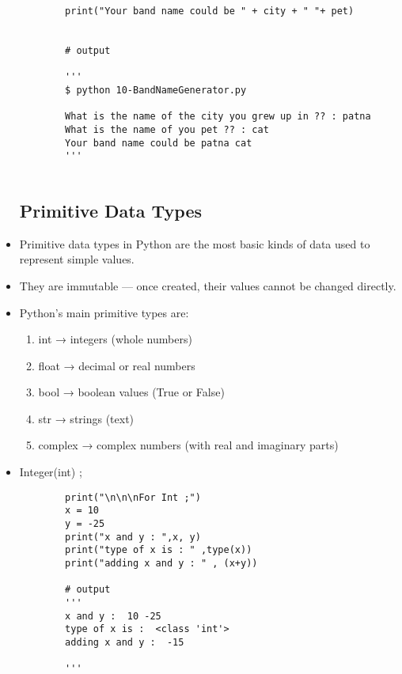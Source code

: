 \documentclass[a4paper,11pt]{article}
\theoremstyle{mytheor}
\begin{document}
\begin{itemize}
\begin{lstlisting}
		print("Your band name could be " + city + " "+ pet)
		
		
		# output
		
		'''
		$ python 10-BandNameGenerator.py

		What is the name of the city you grew up in ?? : patna
		What is the name of you pet ?? : cat
		Your band name could be patna cat
		'''
		
	\end{lstlisting}
	
	\subsection{Primitive Data Types}
	\item Primitive data types in Python are the most basic kinds of data used to represent simple values.
	
	\item They are immutable — once created, their values cannot be changed directly.
	
	\item Python’s main primitive types are:
	\begin{enumerate}
		\item int → integers (whole numbers)
		
		\item float → decimal or real numbers
		
		\item bool → boolean values (True or False)
		
		\item str → strings (text)
		
		\item complex → complex numbers (with real and imaginary parts)
	\end{enumerate}
	
	\item Integer(int) ;
	
	\begin{lstlisting}
		print("\n\n\nFor Int ;")
		x = 10
		y = -25
		print("x and y : ",x, y)
		print("type of x is : " ,type(x))
		print("adding x and y : " , (x+y))
		
		# output
		'''
		x and y :  10 -25
		type of x is :  <class 'int'>
		adding x and y :  -15
		
		'''
	\end{lstlisting}
\end{itemize}
\end{document}
